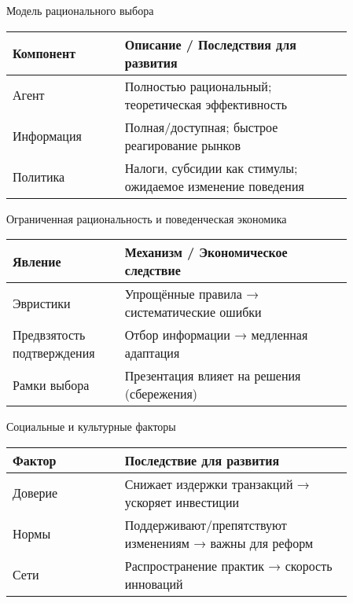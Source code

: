 \documentclass[aspectratio=169]{beamer}
\begin{document}
\begin{frame}{Модель рационального выбора}
\centering
\begin{tabular}{p{0.28\linewidth} p{0.58\linewidth}}
\toprule
Компонент & Описание / Последствия для развития \\
\midrule
Агент & Полностью рациональный; теоретическая эффективность \\
Информация & Полная/доступная; быстрое реагирование рынков \\
Политика & Налоги, субсидии как стимулы; ожидаемое изменение поведения \\
\bottomrule
\end{tabular}
\end{frame}

\begin{frame}{Ограниченная рациональность и поведенческая экономика}
\centering
\begin{tabular}{p{0.28\linewidth} p{0.58\linewidth}}
\toprule
Явление & Механизм / Экономическое следствие \\
\midrule
Эвристики & Упрощённые правила → систематические ошибки \\
Предвзятость подтверждения & Отбор информации → медленная адаптация \\
Рамки выбора & Презентация влияет на решения (сбережения) \\
\bottomrule
\end{tabular}
\end{frame}

\begin{frame}{Социальные и культурные факторы}
\centering
\begin{tabular}{p{0.28\linewidth} p{0.58\linewidth}}
\toprule
Фактор & Последствие для развития \\
\midrule
Доверие & Снижает издержки транзакций → ускоряет инвестиции \\
Нормы & Поддерживают/препятствуют изменениям → важны для реформ \\
Сети & Распространение практик → скорость инноваций \\
\bottomrule
\end{tabular}
\end{frame}
\end{document}
